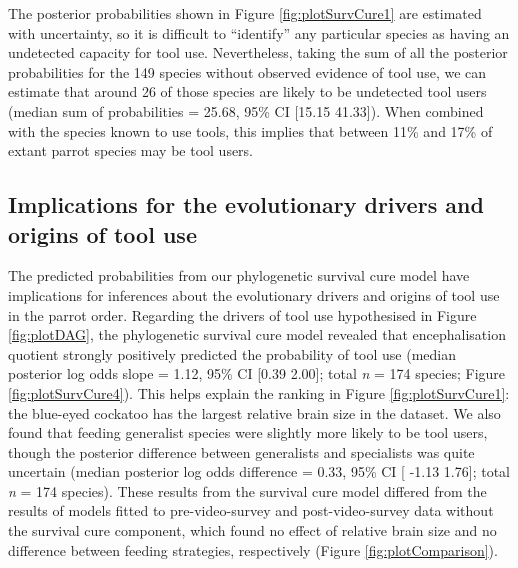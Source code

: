 \documentclass[
  man, donotrepeattitle,floatsintext]{apa6}
\begin{document}
The posterior probabilities shown in Figure \ref{fig:plotSurvCure1} are
estimated with uncertainty, so it is difficult to ``identify'' any particular
species as having an undetected capacity for tool use. Nevertheless, taking the
sum of all the posterior probabilities for the
149 species without
observed evidence of tool use, we can estimate that around
26 of those species are likely to be
undetected tool users (median sum of probabilities =
25.68, 95\% CI
{[}15.15
41.33{]}). When combined with the
species known to use tools, this implies that between 11\% and 17\% of extant
parrot species may be tool users.

\hypertarget{implications-for-the-evolutionary-drivers-and-origins-of-tool-use}{%
\subsection{Implications for the evolutionary drivers and origins of tool use}\label{implications-for-the-evolutionary-drivers-and-origins-of-tool-use}}

The predicted probabilities from our phylogenetic survival cure model have
implications for inferences about the evolutionary drivers and origins of tool
use in the parrot order. Regarding the drivers of tool use hypothesised in
Figure \ref{fig:plotDAG}, the phylogenetic survival cure model revealed that
encephalisation quotient strongly positively predicted the probability of tool
use (median posterior log odds slope = 1.12, 95\%
CI {[}0.39
2.00{]}; total \emph{n} = 174
species; Figure \ref{fig:plotSurvCure4}). This helps explain the ranking in
Figure \ref{fig:plotSurvCure1}: the blue-eyed cockatoo has the largest relative
brain size in the dataset. We also found that feeding generalist species were
slightly more likely to be tool users, though the posterior difference between
generalists and specialists was quite uncertain (median posterior log odds
difference = 0.33, 95\% CI {[}
-1.13 1.76{]}; total
\emph{n} = 174 species). These results from the survival cure model
differed from the results of models fitted to pre-video-survey and
post-video-survey data without the survival cure component, which found no
effect of relative brain size and no difference between feeding strategies,
respectively (Figure \ref{fig:plotComparison}).
\end{document}
